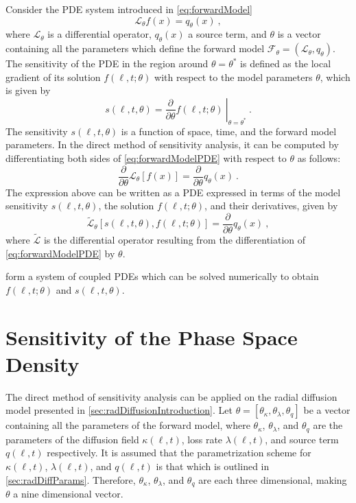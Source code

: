 Consider the PDE system introduced in \cref{eq:forwardModel} 
\begin{equation}\label{eq:forwardModelPDE}
    \mathcal{L}_{\theta} f(x)  = q_{\theta}(x) \ ,
\end{equation}
where $\mathcal{L}_{\theta}$ is a differential operator, $q_{\theta}(x)$ a source term, and 
$\theta$ is a vector containing all the parameters which define the forward model 
$\mathcal{F}_{\theta} = (\mathcal{L}_{\theta}, q_{\theta})$. The sensitivity of the PDE in the 
region around $\theta = \theta^{\ast}$ is defined as the local gradient of its solution 
$f(\ell, t; \theta)$ with respect to the model parameters $\theta$, which is given by 
\[
    s(\ell, t, \theta) =  
    \left. \frac{\partial}{\partial \theta}f(\ell, t; \theta) \ 
    \right\rvert_{\theta = \theta^{\ast}} \ .
\] 
%
The sensitivity $s(\ell, t, \theta)$ is a function of space, time, and the forward model 
parameters. In the direct method of sensitivity analysis, it can be computed by differentiating 
both sides of \cref{eq:forwardModelPDE} with respect to $\theta$ as follows:  
\[
    \frac{\partial}{\partial{\theta}} \mathcal{L}_{\theta}[f(x)] = 
        \frac{\partial}{\partial{\theta}} q_{\theta}(x) \ .
\] 
The expression above can be written as a PDE expressed in terms of the model sensitivity 
$s(\ell, t, \theta)$, the solution $f(\ell, t; \theta)$, and their derivatives, given by 
\begin{equation}\label{eq:forwardModelSens}
   \tilde{\mathcal{L}}_{\theta}[s(\ell, t, \theta), f(\ell, t; \theta)] = 
    \frac{\partial}{\partial{\theta}} q_{\theta}(x) \ ,
\end{equation}
%
where $\tilde{\mathcal{L}}$ is the differential operator resulting from the differentiation of 
\cref{eq:forwardModelPDE} by $\theta$.

 form a system of coupled PDEs which can be 
solved numerically to obtain $f(\ell, t; \theta)$ and $s(\ell, t, \theta)$.

\section*{Sensitivity of the Phase Space Density}

The direct method of sensitivity analysis can be applied on the radial diffusion model presented 
in \cref{sec:radDiffusionIntroduction}. Let 
$\theta = [\theta_{\kappa}, \theta_{\lambda}, \theta_{q}]$ be a vector containing all the 
parameters of the forward model, where $\theta_{\kappa}$, $\theta_{\lambda}$, and $\theta_{q}$ are 
the parameters of the diffusion field $\kappa(\ell, t)$, loss rate $\lambda(\ell, t)$, and 
source term $q(\ell, t)$ respectively. It is assumed that the parametrization scheme for 
$\kappa(\ell, t)$, $\lambda(\ell, t)$, and $q(\ell, t)$ is that which is outlined in 
\cref{sec:radDiffParams}. Therefore, $\theta_{\kappa}$, $\theta_{\lambda}$, and $\theta_{q}$ are 
each three dimensional, making $\theta$ a nine dimensional vector.

